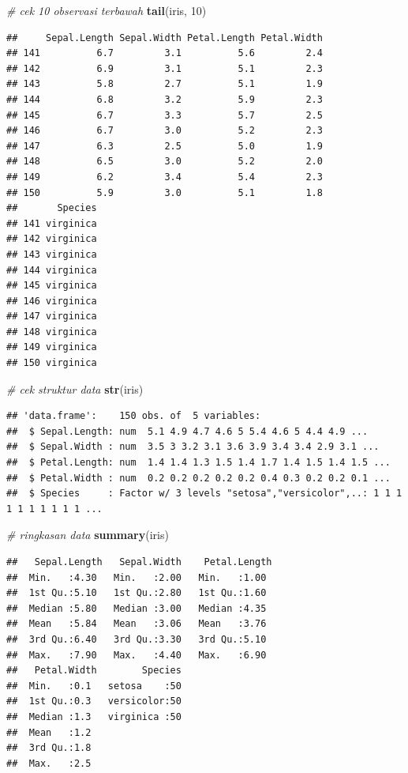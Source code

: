 \documentclass[
]{book}
\newenvironment{Shaded}{\begin{snugshade}}{\end{snugshade}}
\newcommand{\CommentTok}[1]{\textcolor[rgb]{0.56,0.35,0.01}{\textit{#1}}}
\newcommand{\DecValTok}[1]{\textcolor[rgb]{0.00,0.00,0.81}{#1}}
\newcommand{\FunctionTok}[1]{\textcolor[rgb]{0.13,0.29,0.53}{\textbf{#1}}}
\newcommand{\NormalTok}[1]{#1}
\theoremstyle{definition}
\theoremstyle{definition}
\theoremstyle{definition}
\theoremstyle{definition}
\theoremstyle{remark}
\begin{document}
\begin{Shaded}
\begin{Highlighting}[]
\CommentTok{\# cek 10 observasi terbawah}
\FunctionTok{tail}\NormalTok{(iris, }\DecValTok{10}\NormalTok{)}
\end{Highlighting}
\end{Shaded}

\begin{verbatim}
##     Sepal.Length Sepal.Width Petal.Length Petal.Width
## 141          6.7         3.1          5.6         2.4
## 142          6.9         3.1          5.1         2.3
## 143          5.8         2.7          5.1         1.9
## 144          6.8         3.2          5.9         2.3
## 145          6.7         3.3          5.7         2.5
## 146          6.7         3.0          5.2         2.3
## 147          6.3         2.5          5.0         1.9
## 148          6.5         3.0          5.2         2.0
## 149          6.2         3.4          5.4         2.3
## 150          5.9         3.0          5.1         1.8
##       Species
## 141 virginica
## 142 virginica
## 143 virginica
## 144 virginica
## 145 virginica
## 146 virginica
## 147 virginica
## 148 virginica
## 149 virginica
## 150 virginica
\end{verbatim}

\begin{Shaded}
\begin{Highlighting}[]
\CommentTok{\# cek struktur data}
\FunctionTok{str}\NormalTok{(iris)}
\end{Highlighting}
\end{Shaded}

\begin{verbatim}
## 'data.frame':    150 obs. of  5 variables:
##  $ Sepal.Length: num  5.1 4.9 4.7 4.6 5 5.4 4.6 5 4.4 4.9 ...
##  $ Sepal.Width : num  3.5 3 3.2 3.1 3.6 3.9 3.4 3.4 2.9 3.1 ...
##  $ Petal.Length: num  1.4 1.4 1.3 1.5 1.4 1.7 1.4 1.5 1.4 1.5 ...
##  $ Petal.Width : num  0.2 0.2 0.2 0.2 0.2 0.4 0.3 0.2 0.2 0.1 ...
##  $ Species     : Factor w/ 3 levels "setosa","versicolor",..: 1 1 1 1 1 1 1 1 1 1 ...
\end{verbatim}

\begin{Shaded}
\begin{Highlighting}[]
\CommentTok{\# ringkasan data}
\FunctionTok{summary}\NormalTok{(iris)}
\end{Highlighting}
\end{Shaded}

\begin{verbatim}
##   Sepal.Length   Sepal.Width    Petal.Length 
##  Min.   :4.30   Min.   :2.00   Min.   :1.00  
##  1st Qu.:5.10   1st Qu.:2.80   1st Qu.:1.60  
##  Median :5.80   Median :3.00   Median :4.35  
##  Mean   :5.84   Mean   :3.06   Mean   :3.76  
##  3rd Qu.:6.40   3rd Qu.:3.30   3rd Qu.:5.10  
##  Max.   :7.90   Max.   :4.40   Max.   :6.90  
##   Petal.Width        Species  
##  Min.   :0.1   setosa    :50  
##  1st Qu.:0.3   versicolor:50  
##  Median :1.3   virginica :50  
##  Mean   :1.2                  
##  3rd Qu.:1.8                  
##  Max.   :2.5
\end{verbatim}
\end{document}
